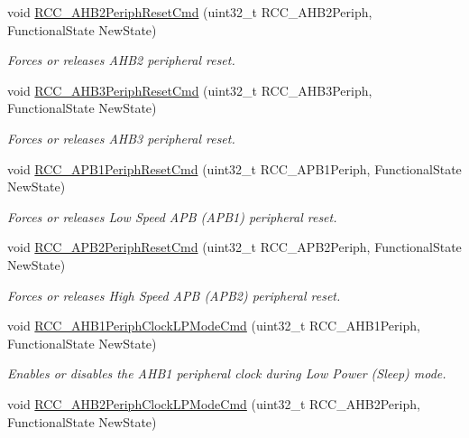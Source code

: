\begin{DoxyCompactItemize}
void \hyperlink{group___r_c_c___group3_gafb119d6d1955d1b8c361e8140845ac5a}{R\-C\-C\-\_\-\-A\-H\-B2\-Periph\-Reset\-Cmd} (uint32\-\_\-t R\-C\-C\-\_\-\-A\-H\-B2\-Periph, Functional\-State New\-State)
\begin{DoxyCompactList}\small\item\em Forces or releases A\-H\-B2 peripheral reset. \end{DoxyCompactList}\item 
void \hyperlink{group___r_c_c___group3_gaee44f159a1ca9ebdd7117bff387cd592}{R\-C\-C\-\_\-\-A\-H\-B3\-Periph\-Reset\-Cmd} (uint32\-\_\-t R\-C\-C\-\_\-\-A\-H\-B3\-Periph, Functional\-State New\-State)
\begin{DoxyCompactList}\small\item\em Forces or releases A\-H\-B3 peripheral reset. \end{DoxyCompactList}\item 
void \hyperlink{group___r_c_c___group3_gab197ae4369c10b92640a733b40ed2801}{R\-C\-C\-\_\-\-A\-P\-B1\-Periph\-Reset\-Cmd} (uint32\-\_\-t R\-C\-C\-\_\-\-A\-P\-B1\-Periph, Functional\-State New\-State)
\begin{DoxyCompactList}\small\item\em Forces or releases Low Speed A\-P\-B (A\-P\-B1) peripheral reset. \end{DoxyCompactList}\item 
void \hyperlink{group___r_c_c___group3_gad94553850ac07106a27ee85fec37efdf}{R\-C\-C\-\_\-\-A\-P\-B2\-Periph\-Reset\-Cmd} (uint32\-\_\-t R\-C\-C\-\_\-\-A\-P\-B2\-Periph, Functional\-State New\-State)
\begin{DoxyCompactList}\small\item\em Forces or releases High Speed A\-P\-B (A\-P\-B2) peripheral reset. \end{DoxyCompactList}\item 
void \hyperlink{group___r_c_c___group3_ga5cd0d5adbc7496d7005b208bd19ce255}{R\-C\-C\-\_\-\-A\-H\-B1\-Periph\-Clock\-L\-P\-Mode\-Cmd} (uint32\-\_\-t R\-C\-C\-\_\-\-A\-H\-B1\-Periph, Functional\-State New\-State)
\begin{DoxyCompactList}\small\item\em Enables or disables the A\-H\-B1 peripheral clock during Low Power (Sleep) mode. \end{DoxyCompactList}\item 
void \hyperlink{group___r_c_c___group3_ga1ac5bb9676ae9b48e50d6a95de922ce3}{R\-C\-C\-\_\-\-A\-H\-B2\-Periph\-Clock\-L\-P\-Mode\-Cmd} (uint32\-\_\-t R\-C\-C\-\_\-\-A\-H\-B2\-Periph, Functional\-State New\-State)

\end{DoxyCompactItemize}
